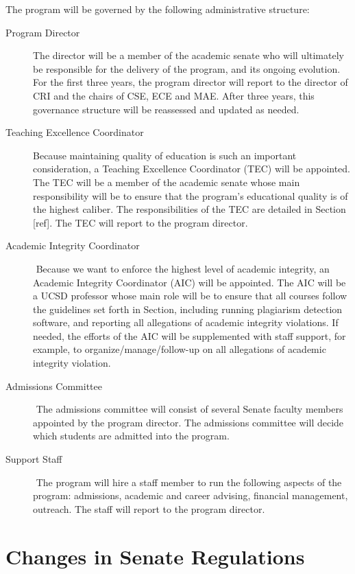 \documentclass[11pt,letterpaper]{article}
\begin{document}
The program will be governed by the following administrative structure:
\begin{description}
\item[Program Director​] The director will be a member of the academic
  senate who will ultimately be responsible for the delivery of the
  program, and its ongoing evolution. For the first three years, the
  program director will report to the director of CRI and the chairs
  of CSE, ECE and MAE. After three years, this governance structure
  will be reassessed and updated as needed.
  
\item[Teaching Excellence Coordinator​] Because maintaining quality of
  education is such an important consideration, a Teaching Excellence
  Coordinator (TEC) will be appointed. The TEC will be a member of the
  academic senate whose main responsibility will be to ensure that the
  program’s educational quality is of the highest caliber. The
  responsibilities of the TEC are detailed in Section [ref]. The TEC
  will report to the program director.

\item[Academic Integrity Coordinator]​ Because we want to enforce the
  highest level of academic integrity, an Academic Integrity
  Coordinator (AIC) will be appointed. The AIC will be a UCSD
  professor whose main role will be to ensure that all courses follow
  the guidelines set forth in Section, including running
  plagiarism detection software, and reporting all allegations of
  academic integrity violations. If needed, the efforts of the AIC
  will be supplemented with staff support, for example, to
  organize/manage/follow-up on all allegations of academic integrity
  violation.

\item[Admissions Committee]​ The admissions committee will consist of
   several Senate faculty members appointed by the program director.
   The admissions committee will decide which students are admitted
   into the program.

\item[Support Staff]​ The program will hire a staff member to run the
   following aspects of the program: admissions, academic and career
   advising, financial management, outreach. The staff will report
   to the program director.
 \end{description}
 
\section{Changes in Senate Regulations}
\end{document}
